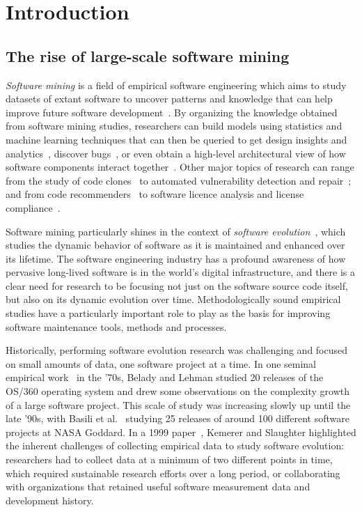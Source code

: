 \chapter{Introduction}%
\label{chp:introduction}

\section{The rise of large-scale software mining}

\emph{Software mining} is a field of empirical software engineering which aims
to study datasets of extant software to uncover patterns and knowledge that can
help improve future software development~\cite{2006-zeller-msr}. By organizing
the knowledge obtained from software mining studies, researchers can build
models using statistics and machine learning techniques that can then be
queried to get design insights and analytics~\cite{hassan2006mining}, discover
bugs~\cite{williams2005automatic,BugRepair2017}, or even obtain a high-level
architectural view of how software components interact
together~\cite{hassan2008road}.
Other major topics of research can range from the study of code
clones~\cite{SvajlenkoR17, SemuraYCI17, ThummalapentaCAP10,
rattan2013clonedetectionreview} to automated vulnerability detection and
repair~\cite{Li2017, Grieco2016, MartinezM15}; and from code
recommenders~\cite{Zeller2007, ZimmermannWDZ04} to software licence analysis
and license compliance~\cite{GermanLicense17, VendomeLicence2015}.

Software mining particularly shines in the context of \emph{software
evolution}~\cite{mens2008swevolintro,kagdi2007msrsurvey}, which studies the
dynamic behavior of software as it is maintained and enhanced over its
lifetime. The software engineering industry has a profound awareness of how
pervasive long-lived software is in the world's digital infrastructure, and
there is a clear need for research to be focusing not just on the software
source code itself, but also on its dynamic evolution over time.
Methodologically sound empirical studies have a particularly important role to
play as the basis for improving software maintenance tools, methods and
processes.

Historically, performing software evolution research was challenging and
focused on small amounts of data, one software project at a time. In one
seminal empirical work~\cite{belady1976model} in the '70s, Belady and Lehman
studied 20 releases of the OS/360 operating system and drew some observations
on the complexity growth of a large software project. This scale of study was
increasing slowly up until the late '90s, with Basili et
al.~\cite{basili1996understanding} studying 25 releases of around 100 different
software projects at NASA Goddard.  In a 1999
paper~\cite{kemerer1999empirical}, Kemerer and Slaughter highlighted the
inherent challenges of collecting empirical data to study software evolution:
researchers had to collect data at a minimum of two different points in time,
which required sustainable research efforts over a long period, or
collaborating with organizations that retained useful software measurement data
and development history.

